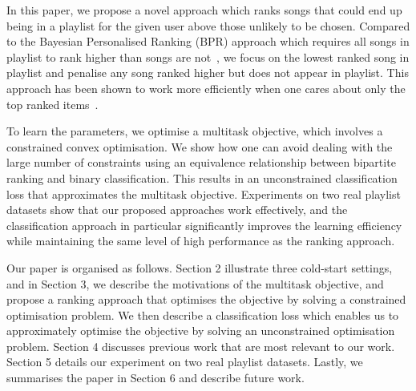 In this paper, we propose a novel approach which ranks songs that could end up being in a playlist for the 
given user above those unlikely to be chosen.
Compared to the Bayesian Personalised Ranking (BPR) approach which requires all
songs in playlist to rank higher than songs are not~\cite{rendle2009bpr,mcfee2012million}, we focus on the lowest ranked
song in playlist and penalise any song ranked higher but does not appear in playlist.
This approach has been shown to work more efficiently when one cares about only the top ranked items~\cite{li2014top}.

To learn the parameters, we optimise a multitask objective,
which involves a constrained convex optimisation.
We show how one can avoid dealing with the large number of constraints using an equivalence relationship 
between bipartite ranking and binary classification.
This results in an unconstrained classification loss that approximates the multitask objective.
Experiments on two real playlist datasets show that our proposed approaches work effectively,
and the classification approach in particular significantly improves the learning efficiency 
while maintaining the same level of high performance as the ranking approach.

Our paper is organised as follows.
Section 2 illustrate three cold-start settings,
and in Section 3, we describe the motivations of the multitask objective, and propose a ranking approach 
that optimises the objective by solving a constrained optimisation problem.
We then describe a classification loss which enables us to approximately optimise the objective by
solving an unconstrained optimisation problem.
Section 4 discusses previous work that are most relevant to our work.
Section 5 details our experiment on two real playlist datasets.
Lastly, we summarises the paper in Section 6 and describe future work.
